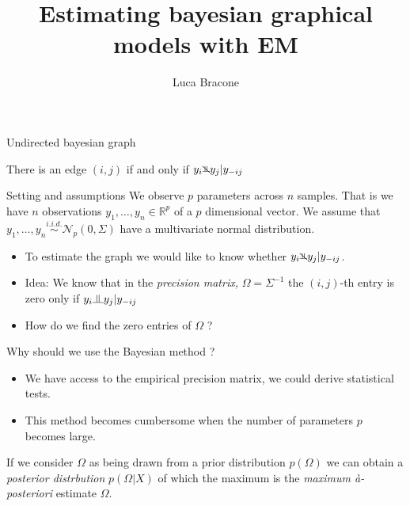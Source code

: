 \documentclass{beamer}
\title{Estimating bayesian graphical models with EM}
\author{Luca Bracone}
\newcommand{\indep}{\raisebox{0.05em}{\rotatebox[origin=c]{90}{$\models$}}}
\newcommand{\nindep}{{\rotatebox[origin=c]{90}{$\nvDash$}}}
\begin{document}
\begin{frame}{Undirected bayesian graph}
	\begin{center}
	\end{center}
	There is an edge $(i,j)$ if and only if $y_i \nindep y_j | y_{-ij}$
\end{frame}
\begin{frame}{Setting and assumptions}
	We observe $p$ parameters across $n$ samples. That is we have
	$n$ observations $y_1, \dots, y_n \in \mathbb{R}^p$ of a $p$ dimensional
	vector. We assume that $y_1, \dots, y_n \stackrel{i.i.d.}{\sim}
		\mathcal{N}_p(0, \Sigma)$ have a multivariate normal distribution.
	\begin{itemize}
		\item To estimate the graph we would like to know whether $y_i \nindep
			      y_j | y_{-ij}$.
		\item Idea: We know that in the \emph{precision matrix,} $\Omega =
			      \Sigma^{-1}$ the $(i,j)$-th entry is zero only if $y_i \indep y_j |
			      y_{-ij}$
		\item How do we find the zero entries of $\Omega$ ?
	\end{itemize}
\end{frame}
\begin{frame}{Why should we use the Bayesian method ?}
	\begin{itemize}
		\item We have access to the empirical precision matrix, we could derive
		      statistical tests.
		\item This method becomes cumbersome when the number of parameters $p$
		      becomes large.
	\end{itemize}
	If we consider $\Omega$ as being drawn from a prior distribution
	$p(\Omega)$ we can obtain a \emph{posterior distrbution} $p(\Omega | X)$
	of which the maximum is the \emph{maximum à-posteriori} estimate
	$\Omega$.
\end{frame}
\end{document}
